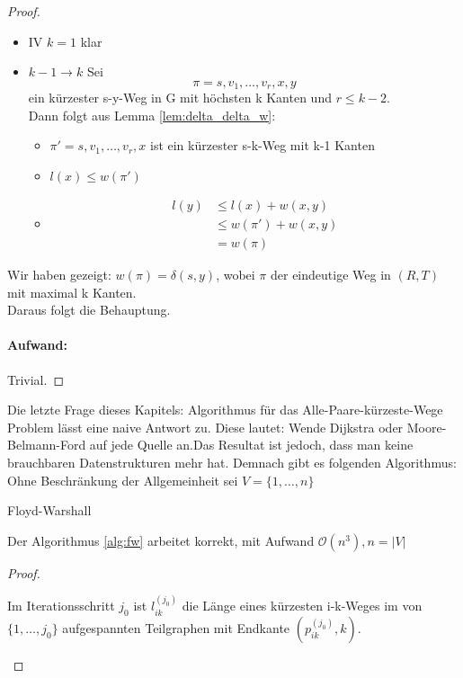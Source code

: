\begin{proof}
\begin{itemize}[label=$\lozenge$, itemsep=2ex]
	\item IV \underline{$k=1$} klar
	\item \underline{$k-1 \to k$} Sei 
		\[
		\pi=s,v_1,\ldots,v_r,x,y
		\]
	ein kürzester s-y-Weg in G mit höchsten k Kanten und $r\le k-2$. \\
	Dann folgt aus Lemma \ref{lem:delta_delta_w}:
	\begin{itemize}
		\item $\pi'=s,v_1,\ldots,v_r,x$ ist ein kürzester s-k-Weg mit k-1 Kanten
		\item $l(x)\le w(\pi')$
		\item \begin{align*}
				l(y)&\le l(x)+w(x,y) \\
				    &\le w(\pi') + w(x,y) \\
				    &= w(\pi)
		\end{align*}
	\end{itemize}
\end{itemize}
Wir haben gezeigt: $w(\pi) = \delta(s,y)$, wobei $\pi$ der eindeutige Weg in $(R,T)$ mit maximal k Kanten. \\
Daraus folgt die Behauptung.
\paragraph{Aufwand:} Trivial.
\end{proof}
Die letzte Frage dieses Kapitels: Algorithmus für das Alle-Paare-kürzeste-Wege Problem lässt eine naive Antwort zu. Diese lautet: Wende Dijkstra oder Moore-Belmann-Ford auf jede Quelle an.Das Resultat ist jedoch, dass man keine brauchbaren Datenstrukturen mehr hat. Demnach gibt es folgenden Algorithmus:\\
Ohne Beschränkung der Allgemeinheit sei $V=\{1,\ldots,n\} $ \\
\begin{algorithm}[H]
	\label{alg:fw}
	\caption{Floyd-Warshall}
\end{algorithm}
\begin{theorem}
	Der Algorithmus \ref{alg:fw} arbeitet korrekt, mit Aufwand $\mathcal{O}(n^3), n=|V|$ 
\end{theorem}
\begin{proof}
\begin{notation}
Im Iterationsschritt $j_0$ ist $l_{ik}^{(j_0)}$ die Länge eines kürzesten i-k-Weges im von $\{1,\ldots,j_0\} $ aufgespannten Teilgraphen mit Endkante $(p_{ik}^{(j_0)},k)$. 
\end{notation}
\end{proof}
